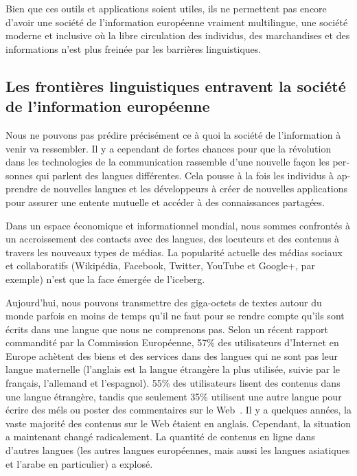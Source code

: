\begin{french}
\begin{multicols}{2}
\begin{itemize}
\end{itemize}

Bien que ces outils et applications soient utiles, ils ne permettent
pas encore d'avoir une société de l'information européenne
vraiment multilingue, une société moderne et inclusive où la libre
circulation des individus, des marchandises et des informations n'est
plus freinée par les barrières linguistiques.

\subsection{Les frontières linguistiques entravent la société de l'information européenne}

Nous ne pouvons pas prédire précisément ce à quoi la société de
l'information à venir va ressembler. Il y a cependant de
fortes chances pour que la révolution dans les technologies de la
communication rassemble d'une nouvelle façon les personnes qui
parlent des langues différentes. Cela pousse à la fois les individus à
apprendre de nouvelles langues et les développeurs à créer de
nouvelles applications pour assurer une entente mutuelle et accéder à
des connaissances partagées.

Dans un espace économique et informationnel mondial, nous sommes
confrontés à un accroissement des contacts avec des langues, des
locuteurs et des contenus à travers les nouveaux types de médias. La
popularité actuelle des médias sociaux et collaboratifs (Wikipédia,
Facebook, Twitter, YouTube et Google+, par exemple) n'est que
la face émergée de l'iceberg.
\vspace{0.25in}

Aujourd'hui, nous pouvons transmettre des giga-octets de textes
autour du monde parfois en moins de temps qu'il ne faut pour se rendre
compte qu'ils sont écrits dans une langue que nous ne comprenons pas.
Selon un récent rapport commandité par la Commission Européenne, 57\%
des utilisateurs d'Internet en Europe achètent des biens et
des services dans des langues qui ne sont pas leur langue maternelle
(l'anglais est la langue étrangère la plus utilisée, suivie
par le français, l'allemand et l'espagnol). 55\% des
utilisateurs lisent des contenus dans une langue étrangère, tandis que
seulement 35\% utilisent une autre langue pour écrire des méls ou
poster des commentaires sur le Web~\cite{Eurobarometer313}. 
Il y a quelques années, la vaste majorité des contenus sur le Web étaient en
anglais. Cependant, la situation a maintenant changé radicalement. La
quantité de contenus en ligne dans d'autres langues (les
autres langues européennes, mais aussi les langues asiatiques et
l'arabe en particulier) a explosé.


\end{multicols}
\end{french}
